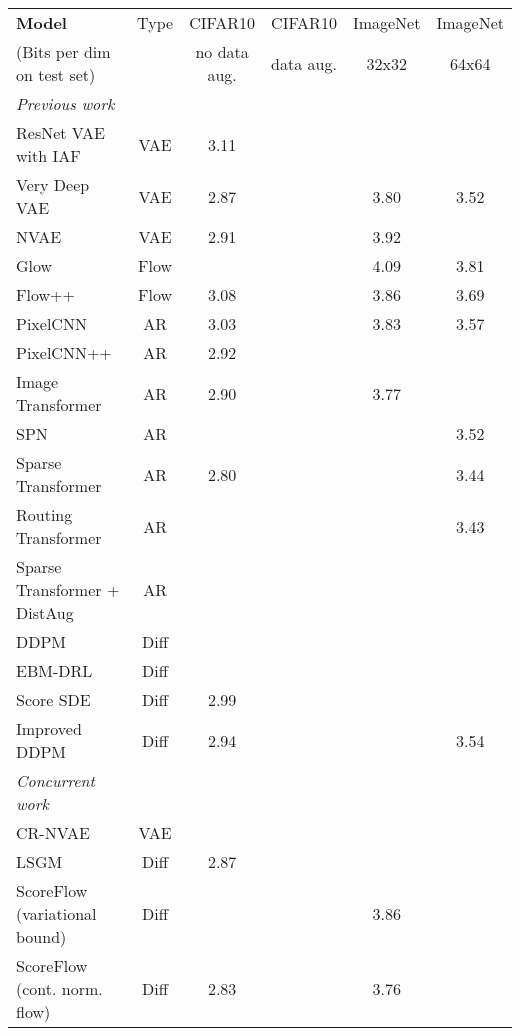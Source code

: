 \documentclass{article}
\begin{document}
\begin{table}[t]
\footnotesize
\begin{center}
\setlength{\tabcolsep}{4pt}
\begin{tabular}{lccccc}
\textbf{Model} & Type & CIFAR10 & CIFAR10 & ImageNet & ImageNet \\
(Bits per dim on test set)&  & no data aug. & data aug. & 32x32 & 64x64\\
\midrule
\textit{Previous work}\\
ResNet VAE with IAF~\citep{kingma2016improving} & VAE & 3.11 & \\
Very Deep VAE~\citep{child2020very} & VAE & 2.87 & & 3.80 & 3.52 \\
NVAE~\citep{vahdat2020nvae} & VAE & 2.91 & & 3.92 & \\
Glow~\citep{kingma2018glow} & Flow & &  & 4.09 & 3.81 \\
Flow++~\citep{ho2019flow++} & Flow & 3.08 & & 3.86 & 3.69 \\
PixelCNN~\citep{van2016pixel} & AR & 3.03 & & 3.83 & 3.57\\
PixelCNN++~\citep{salimans2017pixelcnn++} & AR & 2.92 &\\
Image Transformer~\citep{parmar2018image} & AR & 2.90 & & 3.77\\
SPN ~\citep{menick2018generating} & AR & & & & 3.52 \\
Sparse Transformer~\citep{child2019generating}& AR &2.80 & & & 3.44 \\
Routing Transformer~\citep{roy2021efficient} & AR & & & & 3.43\\
Sparse Transformer + DistAug~\citep{jun2020distribution} & AR & &  & & \\
DDPM~\citep{ho2020denoising} & Diff & &  & & \\
EBM-DRL~\citep{gao2020learning} & Diff & &  & & \\
Score SDE~\citep{song2020score} & Diff & 2.99 & & & \\
Improved DDPM~\citep{nichol2021improved} & Diff & 2.94 & & & 3.54 \\
\midrule
\textit{Concurrent work}\\
CR-NVAE \citep{sinha2021consistency} & VAE & &  \\ 
LSGM~\citep{vahdat2021score} & Diff & 2.87\\
ScoreFlow~\citep{song2021maximum} (variational bound) & Diff & &  & 3.86 & \\
ScoreFlow~\citep{song2021maximum} (cont. norm. flow) & Diff & 2.83 &  & 3.76 & \\

\end{tabular}
\end{center}
\end{table}
\end{document}
